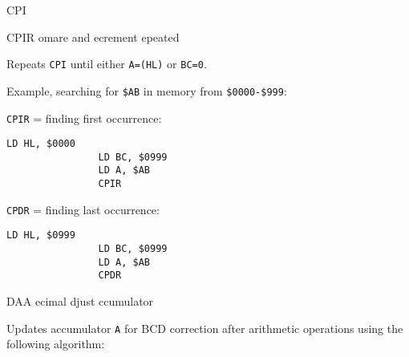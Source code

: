\begin{basedescript}{
    \desclabelstyle{\multilinelabel}
    \desclabelwidth{3cm}}
\begin{DetailItem}{CPI}
    \end{DetailItem}

    \begin{DetailItem}{CPIR}
        {omare and ecrement epeated}
        {\SymCPIR}

        Repeats {\tt CPI} until either {\tt A=(HL)} or {\tt BC=0}.

        Example, searching for {\tt \$AB} in memory from {\tt \$0000-\$999}:

        \begin{multicols}{2}
            {\tt CPIR} = finding first occurrence:
            \begin{lstlisting}[autogobble=true, xrightmargin=1em]
                LD HL, $0000
                LD BC, $0999
                LD A, $AB
                CPIR
            \end{lstlisting}

            {\tt CPDR} = finding last occurrence:
            \begin{lstlisting}[autogobble=true]
                LD HL, $0999
                LD BC, $0999
                LD A, $AB
                CPDR
            \end{lstlisting}
        \end{multicols}

        \begin{DetailEffects}
            \FlagsCPIR
        \end{DetailEffects}
				
        \begin{DetailTiming}
        \end{DetailTiming}

    \end{DetailItem}


    \begin{DetailItem}{DAA}
        {ecimal djust ccumulator}
        {}

        Updates accumulator {\tt A} for BCD correction after arithmetic operations using the following algorithm:


\end{DetailItem}
\end{basedescript}
